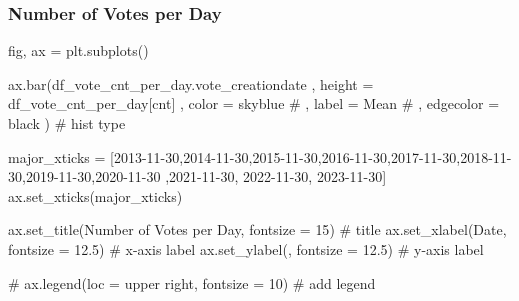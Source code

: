 \documentclass[
  letterpaper,
  DIV=11,
  numbers=noendperiod]{scrartcl}
\newenvironment{Shaded}{\begin{snugshade}}{\end{snugshade}}
\newcommand{\CommentTok}[1]{\textcolor[rgb]{0.37,0.37,0.37}{#1}}
\newcommand{\DecValTok}[1]{\textcolor[rgb]{0.68,0.00,0.00}{#1}}
\newcommand{\FloatTok}[1]{\textcolor[rgb]{0.68,0.00,0.00}{#1}}
\newcommand{\NormalTok}[1]{\textcolor[rgb]{0.00,0.23,0.31}{#1}}
\newcommand{\OperatorTok}[1]{\textcolor[rgb]{0.37,0.37,0.37}{#1}}
\newcommand{\StringTok}[1]{\textcolor[rgb]{0.13,0.47,0.30}{#1}}
\begin{document}
\subsubsection{Number of Votes per Day}\label{number-of-votes-per-day}

\begin{Shaded}
\begin{Highlighting}[]
\NormalTok{fig, ax }\OperatorTok{=}\NormalTok{ plt.subplots()}


\NormalTok{ax.bar(df\_vote\_cnt\_per\_day.vote\_creationdate}
\NormalTok{    ,  height }\OperatorTok{=}\NormalTok{ df\_vote\_cnt\_per\_day[}\StringTok{\textquotesingle{}cnt\textquotesingle{}}\NormalTok{]}
\NormalTok{    ,  color }\OperatorTok{=} \StringTok{\textquotesingle{}skyblue\textquotesingle{}}
    \CommentTok{\# ,  label = \textquotesingle{}Mean\textquotesingle{}}
    \CommentTok{\# ,  edgecolor = \textquotesingle{}black\textquotesingle{}}
\NormalTok{      ) }\CommentTok{\# hist type}


\NormalTok{major\_xticks }\OperatorTok{=}\NormalTok{ [}\StringTok{\textquotesingle{}2013{-}11{-}30\textquotesingle{}}\NormalTok{,}\StringTok{\textquotesingle{}2014{-}11{-}30\textquotesingle{}}\NormalTok{,}\StringTok{\textquotesingle{}2015{-}11{-}30\textquotesingle{}}\NormalTok{,}\StringTok{\textquotesingle{}2016{-}11{-}30\textquotesingle{}}\NormalTok{,}\StringTok{\textquotesingle{}2017{-}11{-}30\textquotesingle{}}\NormalTok{,}\StringTok{\textquotesingle{}2018{-}11{-}30\textquotesingle{}}\NormalTok{,}\StringTok{\textquotesingle{}2019{-}11{-}30\textquotesingle{}}\NormalTok{,}\StringTok{\textquotesingle{}2020{-}11{-}30\textquotesingle{}}
\NormalTok{                ,}\StringTok{\textquotesingle{}2021{-}11{-}30\textquotesingle{}}\NormalTok{, }\StringTok{\textquotesingle{}2022{-}11{-}30\textquotesingle{}}\NormalTok{, }\StringTok{\textquotesingle{}2023{-}11{-}30\textquotesingle{}}\NormalTok{]}
\NormalTok{ax.set\_xticks(major\_xticks)}

\NormalTok{ax.set\_title(}\StringTok{\textquotesingle{}Number of Votes per Day\textquotesingle{}}\NormalTok{, fontsize }\OperatorTok{=} \DecValTok{15}\NormalTok{) }\CommentTok{\# title}
\NormalTok{ax.set\_xlabel(}\StringTok{\textquotesingle{}Date\textquotesingle{}}\NormalTok{, fontsize }\OperatorTok{=} \FloatTok{12.5}\NormalTok{) }\CommentTok{\# x{-}axis label}
\NormalTok{ax.set\_ylabel(}\StringTok{\textquotesingle{}\textquotesingle{}}\NormalTok{, fontsize }\OperatorTok{=} \FloatTok{12.5}\NormalTok{) }\CommentTok{\# y{-}axis label}

\CommentTok{\# ax.legend(loc = \textquotesingle{}upper right\textquotesingle{}, fontsize = 10) \# add legend}


\end{Highlighting}
\end{Shaded}
\end{document}
